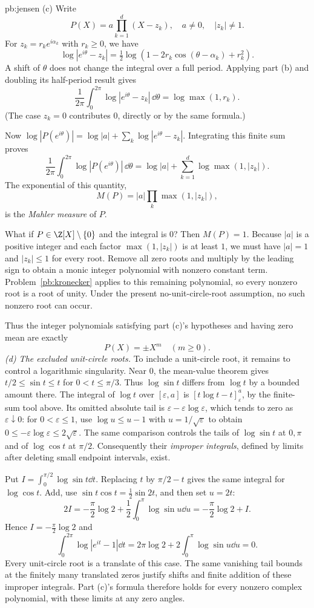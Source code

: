 \begin{solution}{pb:jensen}
(c) Write
\[
P(X)=a\prod_{k=1}^d(X-z_k),
\quad a\ne0,\quad |z_k|\ne1.
\]
For $z_k=r_ke^{i\alpha_k}$ with $r_k\ge0$, we have
\[
\log|e^{i\theta}-z_k|
=\tfrac12\log(1-2r_k\cos(\theta-\alpha_k)+r_k^2).
\]
A shift of $\theta$ does not change the integral over a full period. Applying part (b) and doubling its half-period result gives
\[
\frac1{2\pi}\int_0^{2\pi}
\log|e^{i\theta}-z_k|\,\dd\theta
=\log\max(1,r_k).
\]
(The case $z_k=0$ contributes $0$, directly or by the same formula.)

Now $\log|P(e^{i\theta})|
=\log|a|+\sum_k\log|e^{i\theta}-z_k|$. Integrating this finite sum proves
\[
\boxed{\frac1{2\pi}\int_0^{2\pi}\log|P(e^{i\theta})|\,\dd\theta
=\log|a|+\sum_{k=1}^d\log\max(1,|z_k|)}.
\]
The exponential of this quantity,
\[
M(P)=|a|\prod_k\max(1,|z_k|),
\]
is the \emph{Mahler measure} of $P$.

What if $P\in\Z[X]\setminus\{0\}$ and the integral is $0$? Then $M(P)=1$. Because $|a|$ is a positive integer and each factor $\max(1,|z_k|)$ is at least $1$, we must have $|a|=1$ and $|z_k|\le1$ for every root. Remove all zero roots and multiply by the leading sign to obtain a monic integer polynomial with nonzero constant term. Problem~\ref{pb:kronecker} applies to this remaining polynomial, so every nonzero root is a root of unity. Under the present no-unit-circle-root assumption, no such nonzero root can occur.

Thus the integer polynomials satisfying part (c)'s hypotheses and having zero mean are exactly
\[
\boxed{P(X)=\pm X^m\quad(m\ge0)}.
\]
\emph{(d) The excluded unit-circle roots.}
To include a unit-circle root, it remains to control a logarithmic singularity. Near $0$, the mean-value theorem gives
$t/2\le\sin t\le t$ for $0<t\le\pi/3$.
Thus $\log\sin t$ differs from $\log t$ by a bounded amount there.
The integral of $\log t$ over $[\varepsilon,a]$ is
$[t\log t-t]_{\varepsilon}^a$, by the finite-sum tool above.
Its omitted absolute tail is $\varepsilon-\varepsilon\log\varepsilon$,
which tends to zero as $\varepsilon\downarrow0$: for $0<\varepsilon\le1$, use $\log u\le u-1$ with
$u=1/\sqrt\varepsilon$ to obtain
$0\le-\varepsilon\log\varepsilon\le2\sqrt\varepsilon$.
The same comparison controls the tails of $\log\sin t$ at $0,\pi$ and
of $\log\cos t$ at $\pi/2$. Consequently their \emph{improper integrals},
defined by limits after deleting small endpoint intervals, exist.

Put $I=\int_0^{\pi/2}\log\sin t\dd t$.
Replacing $t$ by $\pi/2-t$ gives the same integral for $\log\cos t$.
Add, use $\sin t\cos t=\tfrac12\sin2t$, and then set $u=2t$:
\[
2I=-\frac\pi2\log2+\frac12\int_0^\pi\log\sin u\dd u
   =-\frac\pi2\log2+I.
\]
Hence $I=-\frac\pi2\log2$ and
\[
\int_0^{2\pi}\log|e^{it}-1|\dd t
=2\pi\log2+2\int_0^\pi\log\sin u\dd u=0.
\]
Every unit-circle root is a translate of this case. The same vanishing
tail bounds at the finitely many translated zeros justify shifts and finite
addition of these improper integrals. Part (c)'s formula therefore holds
for every nonzero complex polynomial, with these limits at any zero angles.


\end{solution}
